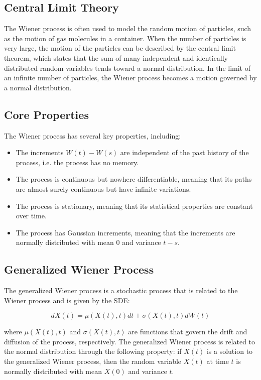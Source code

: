 \documentclass{article}
\theoremstyle{mytheoremstyle}
\theoremstyle{mytheoremstyle}
\theoremstyle{myproblemstyle}
\begin{document}
\subsection{Central Limit Theory}
The Wiener process is often used to model the random motion of particles, such as the motion of gas molecules in a container. When the number of particles is very large, the motion of the particles can be described by the central limit theorem, which states that the sum of many independent and identically distributed random variables tends toward a normal distribution. In the limit of an infinite number of particles, the Wiener process becomes a motion governed by a normal distribution.

\subsection{Core Properties}
The Wiener process has several key properties, including:
\begin{itemize}
\item The increments $W(t) - W(s)$ are independent of the past history of the process, i.e. the process has no memory.
\item The process is continuous but nowhere differentiable, meaning that its paths are almost surely continuous but have infinite variations.
\item The process is stationary, meaning that its statistical properties are constant over time.
\item The process has Gaussian increments, meaning that the increments are normally distributed with mean 0 and variance $t-s$.
\end{itemize}

\subsection{Generalized Wiener Process}
The generalized Wiener process is a stochastic process that is related to the Wiener process and is given by the SDE:

\begin{equation}
dX(t) = \mu(X(t),t)dt + \sigma(X(t),t)dW(t)
\end{equation}

where $\mu(X(t),t)$ and $\sigma(X(t),t)$ are functions that govern the drift and diffusion of the process, respectively. The generalized Wiener process is related to the normal distribution through the following property: if $X(t)$ is a solution to the generalized Wiener process, then the random variable $X(t)$ at time $t$ is normally distributed with mean $X(0)$ and variance $t$.
\end{document}
